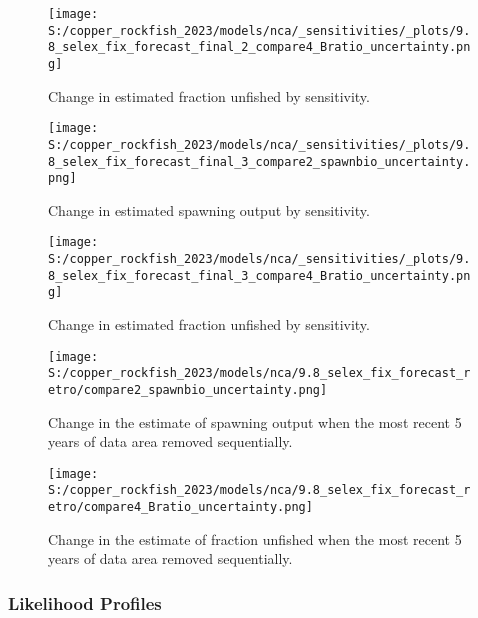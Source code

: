 \documentclass[11pt,
  english,
  letterpaper,
]{article}
\begin{document}
\newpage

\begin{figure}
\centering
\texttt{[image: S:/copper\_rockfish\_2023/models/nca/\_sensitivities/\_plots/9.8\_selex\_fix\_forecast\_final\_2\_compare4\_Bratio\_uncertainty.png]}
\caption{Change in estimated fraction unfished by sensitivity.\label{fig:sens-depl-2}}
\end{figure}

\newpage

\begin{figure}
\centering
\texttt{[image: S:/copper\_rockfish\_2023/models/nca/\_sensitivities/\_plots/9.8\_selex\_fix\_forecast\_final\_3\_compare2\_spawnbio\_uncertainty.png]}
\caption{Change in estimated spawning output by sensitivity.\label{fig:sens-ssb-3}}
\end{figure}

\newpage

\begin{figure}
\centering
\texttt{[image: S:/copper\_rockfish\_2023/models/nca/\_sensitivities/\_plots/9.8\_selex\_fix\_forecast\_final\_3\_compare4\_Bratio\_uncertainty.png]}
\caption{Change in estimated fraction unfished by sensitivity.\label{fig:sens-depl-3}}
\end{figure}

\newpage

\begin{figure}
\centering
\texttt{[image: S:/copper\_rockfish\_2023/models/nca/9.8\_selex\_fix\_forecast\_retro/compare2\_spawnbio\_uncertainty.png]}
\caption{Change in the estimate of spawning output when the most recent 5 years of data area removed sequentially.\label{fig:retro-ssb}}
\end{figure}

\pagebreak

\begin{figure}
\centering
\texttt{[image: S:/copper\_rockfish\_2023/models/nca/9.8\_selex\_fix\_forecast\_retro/compare4\_Bratio\_uncertainty.png]}
\caption{Change in the estimate of fraction unfished when the most recent 5 years of data area removed sequentially.\label{fig:retro-depl}}
\end{figure}

\pagebreak

\hypertarget{likelihood-profiles-1}{%
\subsubsection{Likelihood Profiles}\label{likelihood-profiles-1}}
\end{document}
